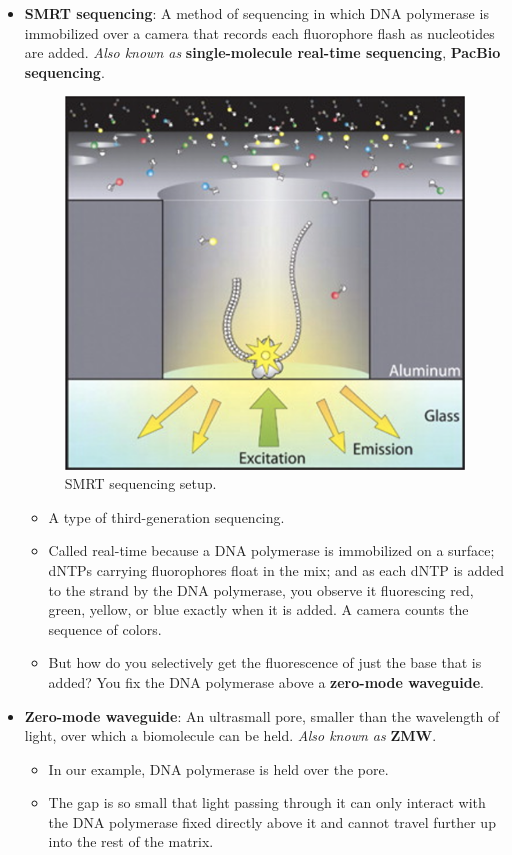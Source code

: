 \documentclass[../notes.tex]{subfiles}
\begin{document}
\begin{itemize}
\begin{itemize}
\begin{itemize}
        \end{itemize}
    \end{itemize}
    \item \textbf{SMRT sequencing}: A method of sequencing in which DNA polymerase is immobilized over a camera that records each fluorophore flash as nucleotides are added. \emph{Also known as} \textbf{single-molecule real-time sequencing}, \textbf{PacBio sequencing}.
    \begin{figure}[h!]
        \centering
        \includegraphics[width=0.4\linewidth]{../ExtFiles/sequencingSMRT.png}
        \caption{SMRT sequencing setup.}
        \label{fig:sequencingSMRT}
    \end{figure}
    \begin{itemize}
        \item A type of third-generation sequencing.
        \item Called real-time because a DNA polymerase is immobilized on a surface; dNTPs carrying fluorophores float in the mix; and as each dNTP is added to the strand by the DNA polymerase, you observe it fluorescing red, green, yellow, or blue exactly when it is added. A camera counts the sequence of colors.
        \item But how do you selectively get the fluorescence of just the base that is added? You fix the DNA polymerase above a \textbf{zero-mode waveguide}.
    \end{itemize}
    \item \textbf{Zero-mode waveguide}: An ultrasmall pore, smaller than the wavelength of light, over which a biomolecule can be held. \emph{Also known as} \textbf{ZMW}.
    \begin{itemize}
        \item In our example, DNA polymerase is held over the pore.
        \item The gap is so small that light passing through it can only interact with the DNA polymerase fixed directly above it and cannot travel further up into the rest of the matrix.

\end{itemize}
\end{itemize}
\end{document}
